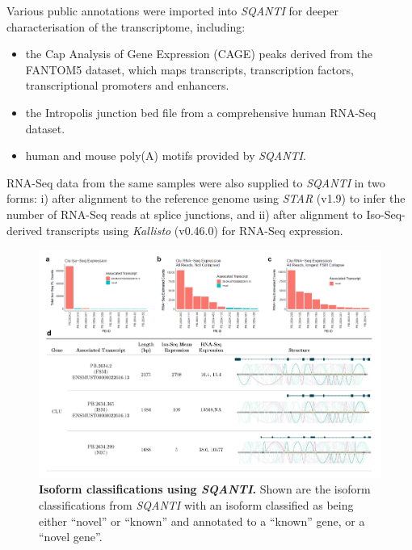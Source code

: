 Various public annotations were imported into \textit{SQANTI} for deeper characterisation of the transcriptome, including:
\begin{itemize}
	\item the Cap Analysis of Gene Expression (CAGE) peaks derived from the FANTOM5 dataset\cite{Lizio2019}, which maps transcripts, transcription factors, transcriptional promoters and enhancers.
	\item the Intropolis junction bed file\cite{Nellore2016} from a comprehensive human RNA-Seq dataset.
	\item human and mouse poly(A) motifs provided by \textit{SQANTI}.	 
\end{itemize}

RNA-Seq data from the same samples were also supplied to \textit{SQANTI} in two forms: i) after alignment to the reference genome using \textit{STAR}\cite{Dobin2013} (v1.9) to infer the number of RNA-Seq reads at splice junctions, and ii) after alignment to Iso-Seq-derived transcripts using \textit{Kallisto}\cite{Bray2016} (v0.46.0) for RNA-Seq expression.  

\begin{landscape}
	\begin{figure}[h]
		\centering
		\includegraphics[page=3,trim={0 3.5cm 0 0},clip,scale = 0.9]{Figures/ProjectDevelopment_Figures_Landscape}
		\captionsetup{width=1.5\textwidth}
		\caption[Isoform classifications using \textit{SQANTI}]%
		{\textbf{Isoform classifications using \textit{SQANTI}.} Shown are the isoform classifications from \textit{SQANTI} with an isoform classified as being either “novel” or “known” and annotated to a “known” gene, or a “novel gene”.}
		\label{fig:sqanti_cate}
	\end{figure}
\end{landscape}

